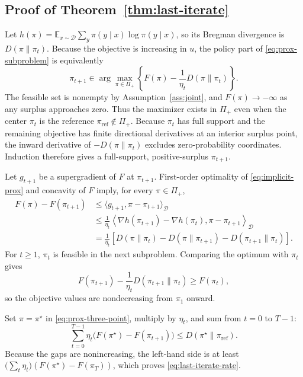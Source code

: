 \documentclass{article}
\theoremstyle{remark}
\theoremstyle{plain}
\newcommand{\E}{\mathbb{E}}
\newcommand{\D}{\mathcal{D}}
\newcommand{\piref}{\pi_{\mathrm{ref}}}
\begin{document}
\subsection{Proof of Theorem~\ref{thm:last-iterate}}
\label{app:convergence}
Let $h(\pi)=\E_{x\sim\D}\sum_y\pi(y\mid x)\log\pi(y\mid x)$, so its Bregman divergence is $D(\pi\|\pi_t)$. Because the objective is increasing in $u$, the policy part of \eqref{eq:prox-subproblem} is equivalently
\begin{equation}
\pi_{t+1}
\in
\arg\max_{\pi\in\Pi_+}
\left\{F(\pi)-\frac1{\eta_t}D(\pi\|\pi_t)\right\}.
\label{eq:implicit-prox}
\end{equation}
The feasible set is nonempty by Assumption~\ref{ass:joint}, and $F(\pi)\to-\infty$ as any surplus approaches zero. Thus the maximizer exists in $\Pi_+$ even when the center $\pi_t$ is the reference $\piref\notin\Pi_+$. Because $\pi_t$ has full support and the remaining objective has finite directional derivatives at an interior surplus point, the inward derivative of $-D(\pi\|\pi_t)$ excludes zero-probability coordinates. Induction therefore gives a full-support, positive-surplus $\pi_{t+1}$.

Let $g_{t+1}$ be a supergradient of $F$ at $\pi_{t+1}$. First-order optimality of \eqref{eq:implicit-prox} and concavity of $F$ imply, for every $\pi\in\Pi_+$,
\begin{align}
F(\pi)-F(\pi_{t+1})
&\le \langle g_{t+1},\pi-\pi_{t+1}\rangle_\D\\
&\le\frac1{\eta_t}
\left\langle\nabla h(\pi_{t+1})-\nabla h(\pi_t),
\pi-\pi_{t+1}\right\rangle_\D\\
&=\frac1{\eta_t}
\left[
D(\pi\|\pi_t)-D(\pi\|\pi_{t+1})-D(\pi_{t+1}\|\pi_t)
\right].
\label{eq:prox-three-point}
\end{align}
For $t\ge1$, $\pi_t$ is feasible in the next subproblem. Comparing the optimum with $\pi_t$ gives
\begin{equation}
F(\pi_{t+1})-\frac{1}{\eta_t}D(\pi_{t+1}\|\pi_t)
\ge F(\pi_t),
\label{eq:prox-monotone}
\end{equation}
so the objective values are nondecreasing from $\pi_1$ onward.

Set $\pi=\pi^\star$ in \eqref{eq:prox-three-point}, multiply by $\eta_t$, and sum from $t=0$ to $T-1$:
\begin{equation}
\sum_{t=0}^{T-1}\eta_t
\big(F(\pi^\star)-F(\pi_{t+1})\big)
\le
D(\pi^\star\|\piref).
\label{eq:prox-telescope}
\end{equation}
Because the gaps are nonincreasing, the left-hand side is at least
$\big(\sum_t\eta_t\big)(F(\pi^\star)-F(\pi_T))$, which proves \eqref{eq:last-iterate-rate}.
\end{document}
